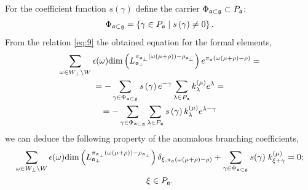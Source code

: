 \documentclass[a4paper,12pt]{article}
\theoremstyle{definition} \newtheorem{Def}{Definition}
\begin{document}
For the coefficient function $s\left( \gamma \right) $ define the carrier $\Phi _{\frak{a%
}\subset \frak{g}}\subset P_{\frak{a}}$:
\begin{equation}
\Phi _{\frak{a}\subset \frak{g}}=\left\{ \gamma \in P_{\frak{a}}\mid s\left(
\gamma \right) \neq 0\right\} .  \label{phi-d}
\end{equation}
From the relation \eqref{eq:9} the obtained equation for the formal elements,
\begin{multline}
  \label{eq:16}
  \sum_{\omega\in W_{\bot}\backslash W} \epsilon(\omega) \mathrm{dim}\left(L^{\pi_{\mathfrak{a}_{\bot}}(\omega(\mu+\rho))-\rho_{\mathfrak{a}_{\bot}}}_{\mathfrak{a}_{\bot}}\right) e^{\pi_{\mathfrak{a}}(\omega(\mu+\rho)-\rho)}=\\
  = -\sum_{\gamma \in \Phi _{\frak{a}\subset \frak{g}}} s\left( \gamma \right) e^{-\gamma }\sum_{\lambda \in P_{\frak{a}}}
  k_{\lambda }^{\left( \mu \right) }e^{\lambda } =\\
  =-\sum_{\gamma \in \Phi _{\frak{a}\subset \frak{g}}}\sum_{\lambda \in P_{\frak{a}}}s\left( \gamma \right) k_{\lambda }^{\left( \mu \right)}e^{\lambda -\gamma }
\end{multline}
we can deduce the following property of the anomalous branching coefficients,
\begin{multline}
  \label{eq:17}
   \sum_{\omega\in W_{\bot}\backslash W} \epsilon(\omega) \mathrm{dim}\left(L^{\pi_{\mathfrak{a}_{\bot}}(\omega(\mu+\rho))-\rho_{\mathfrak{a}_{\bot}}}_{\mathfrak{a}_{\bot}}\right) \delta_{\xi,\pi_{\mathfrak{a}}(\omega(\mu+\rho)-\rho)}+
   \sum_{\gamma \in \Phi _{\frak{a}\subset \frak{g}}} s(\gamma)\; k^{(\mu)}_{\xi+\gamma}=0;\\ \xi\in P_{\mathfrak{a}}.
\end{multline}
\end{document}
